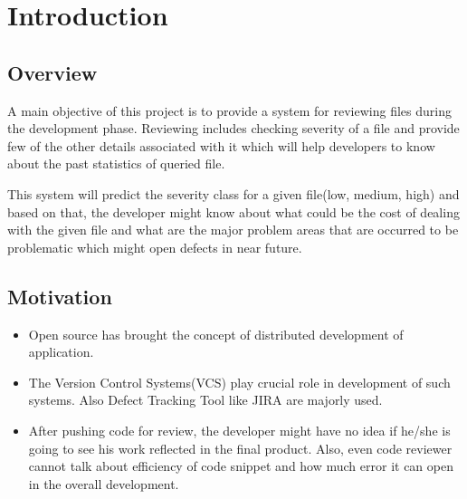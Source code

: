 \documentclass[oneside,a4paper,12pt]{book}
\renewcommand{\headrulewidth}{0pt}
\begin{document}
\setlength{\parindent}{11mm}

\pagestyle{fancy}
\fancyhf{}
\renewcommand{\headrulewidth}{2pt}
\renewcommand{\footrulewidth}{1pt}

\chapter{Introduction}

\section{Overview}
\setlength{\parskip}{0.0pt}
	\item A main objective of this project is to provide a system for reviewing files during the development phase. Reviewing includes checking severity of a file and provide few of the other details associated with it which will help developers to know about the past statistics of queried file.\par

\setlength{\parskip}{9.96pt}
	\item This system will predict the severity class for a given file(low, medium, high) and based on that, the developer might know about what could be the cost of dealing with the given file and what are the major problem areas that are occurred to be problematic which might open defects in near future.\par

\section{Motivation}
\setlength{\parskip}{0.0pt}
\begin{itemize}
	\item Open source has brought the concept of distributed development of application.\par

	\item The Version Control Systems(VCS) play crucial role in development of such systems. Also Defect Tracking Tool like JIRA are majorly used.\par

	\item After pushing code for review, the developer might have no idea if he/she is going to see his work reflected in the final product. Also, even code reviewer cannot talk about efficiency of code snippet and how much error it can open in the overall development.
\end{itemize}\par
\end{document}

